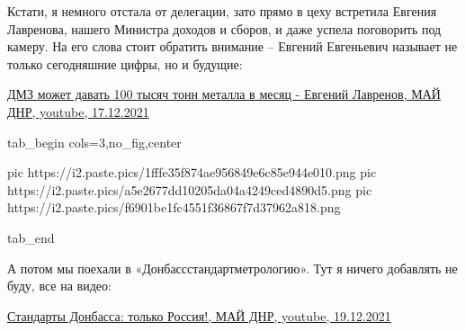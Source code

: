 Кстати, я немного отстала от делегации, зато прямо в цеху встретила Евгения
Лавренова, нашего Министра доходов и сборов, и даже успела поговорить под
камеру. На его слова стоит обратить внимание – Евгений Евгеньевич называет не
только сегодняшние цифры, но и будущие:

\href{https://www.youtube.com/watch?v=dkEUYGFAyNo}{%
ДМЗ может давать 100 тысяч тонн металла в месяц - Евгений Лавренов, МАЙ ДНР, youtube, %
17.12.2021%
}

\ifcmt
  tab_begin cols=3,no_fig,center

     pic https://i2.paste.pics/1fffe35f874ae956849e6c85e944e010.png
		 pic https://i2.paste.pics/a5e2677dd10205da04a4249ced4890d5.png
		 pic https://i2.paste.pics/f6901be1fc4551f36867f7d37962a818.png

  tab_end
\fi

А потом мы поехали в «Донбассстандартметрологию». Тут я ничего добавлять не
буду, все на видео:

\href{https://www.youtube.com/watch?v=_BN6UZckBjk}{%
Стандарты Донбасса: только Россия!, МАЙ ДНР, youtube, 19.12.2021%
}
